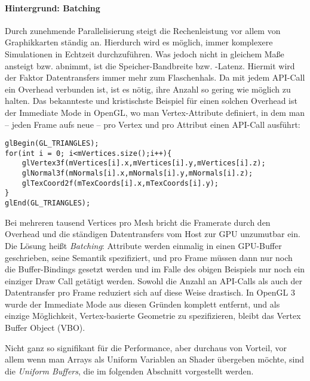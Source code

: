 	\paragraph{Hintergrund: Batching}
	Durch zunehmende Parallelisierung steigt die Rechenleistung vor allem von Graphikkarten ständig an.
	Hierdurch wird es möglich, immer komplexere Simulationen in Echtzeit durchzuführen.
	Was jedoch nicht in gleichem Maße ansteigt bzw. abnimmt, ist die Speicher-Bandbreite bzw. -Latenz.
	Hiermit wird der Faktor Datentransfers immer mehr zum Flaschenhals. Da mit jedem API-Call ein
	Overhead verbunden ist, ist es nötig, ihre Anzahl so gering wie möglich zu halten.
	Das bekannteste und kristischste Beispiel für einen solchen Overhead ist der Immediate Mode in OpenGL, 
	wo man Vertex-Attribute definiert, in dem man -- jeden Frame aufs neue -- 
	pro Vertex und pro Attribut einen API-Call ausführt:
	
	\begin{lstlisting}
glBegin(GL_TRIANGLES);
for(int i = 0; i<mVertices.size();i++){
	glVertex3f(mVertices[i].x,mVertices[i].y,mVertices[i].z);
	glNormal3f(mNormals[i].x,mNormals[i].y,mNormals[i].z);
	glTexCoord2f(mTexCoords[i].x,mTexCoords[i].y);
}
glEnd(GL_TRIANGLES);
	\end{lstlisting}
	
	Bei mehreren tausend Vertices pro Mesh bricht die Framerate durch den Overhead und die ständigen Datentransfers
	vom Host zur GPU unzumutbar ein.
	Die Lösung heißt \emph{Batching}: Attribute werden einmalig in einen GPU-Buffer geschrieben, seine
	Semantik spezifiziert, und pro Frame müssen dann nur noch die Buffer-Bindings gesetzt werden 
	und im Falle des obigen Beispiels nur noch ein einziger Draw Call getätigt werden.
	Sowohl die Anzahl an API-Calls als auch der Datentransfer pro Frame reduziert sich auf diese Weise drastisch.
	In OpenGL 3 wurde der Immediate Mode aus diesen Gründen komplett entfernt, und als einzige Möglichkeit,
	Vertex-basierte Geometrie zu spezifizieren, bleibt das Vertex Buffer Object (VBO).
	
	Nicht ganz so signifikant für die Performance, aber durchaus von Vorteil, vor allem wenn man Arrays als Uniform 
	Variablen an Shader übergeben möchte, sind die \emph{Uniform Buffers}, die im folgenden Abschnitt vorgestellt werden.
	

